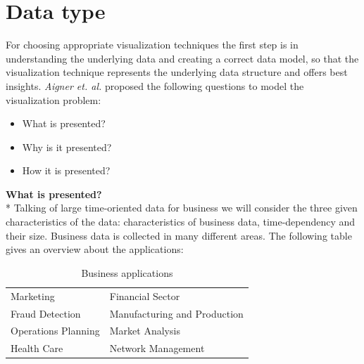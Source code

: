 







\section{Data type} \label{data}

For choosing appropriate visualization techniques the first step is in understanding the underlying data and creating a correct data model\cite{Aigner2011}, so that the visualization technique represents the underlying data structure and offers best insights\cite{Bacic}. \textit{Aigner et. al.} proposed  the following questions to model the visualization problem: 

\begin{itemize}
    \item What is presented?
    \item Why is it presented?
    \item How it is presented?
\end{itemize}
\textbf{What is presented?}\\*
Talking of large time-oriented data for business we will consider the three given characteristics of the data: characteristics of business data, time-dependency and their size. Business data is collected in many different areas. The following table gives an overview about the applications: 

\begin{table}[th]
	\centering
	\caption[Table 1]{Business applications\cite{Brachman1996,Tegarden1999}}
	\label{businessapplications}
	\begin{tabu}{ll}
	\toprule
	Marketing & Financial Sector \\
	Fraud Detection & Manufacturing and Production \\
	Operations Planning & Market Analysis \\
	Health Care & Network Management\\
	\bottomrule
	\end{tabu}
\end{table}

